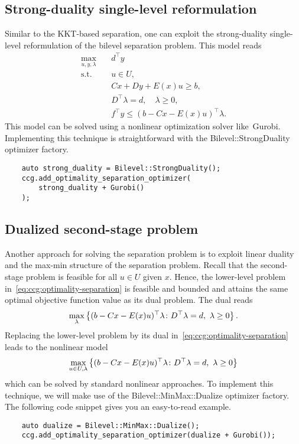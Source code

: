 \subsection{Strong-duality single-level reformulation}

Similar to the KKT-based separation, one can exploit the strong-duality
single-level reformulation of the bilevel separation problem. This model reads
\begin{align*}
    \max_{u,y,\lambda} \quad & d^\top y \\
    \text{s.t.} \quad & u\in U, \\
    & Cx + Dy + E(x)u \ge b, \\ 
    & D^\top \lambda = d, \quad \lambda\ge 0, \\
    & f^\top y \le (b - Cx - E(x)u)^\top\lambda.
\end{align*}
%
This model can be solved using a nonlinear optimization solver
like~\textsf{Gurobi}. Implementing this technique is straightforward with the
\textsf{Bilevel::StrongDuality} optimizer factory.
%
\begin{lstlisting}
    auto strong_duality = Bilevel::StrongDuality();
    ccg.add_optimality_separation_optimizer(
        strong_duality + Gurobi()
    );
\end{lstlisting}

\subsection{Dualized second-stage problem}

Another approach for solving the separation problem is to exploit linear
duality and the max-min structure of the separation problem. Recall that the
second-stage problem is feasible for all $u\in U$ given $x$. Hence, the
lower-level problem in~\eqref{eq:ccg:optimality-separation} is feasible and
bounded and attains the same optimal objective function value as its dual
problem. The dual reads
\begin{equation*}
    \max_{\lambda} \left\{ (b - Cx - E(x)u)^\top\lambda \colon D^\top \lambda = d, \ \lambda \ge 0 \right\}.
\end{equation*}
Replacing the lower-level problem by its dual
in~\eqref{eq:ccg:optimality-separation} leads to the nonlinear model
\begin{equation}
    \label{eq:ccg:optimality-duality-separation}
    \max_{u\in U, \lambda} \left\{ (b - Cx - E(x)u)^\top\lambda \colon D^\top \lambda = d, \ \lambda \ge 0 \right\}
\end{equation}
which can be solved by standard nonlinear approaches. To implement this
technique, we will make use of the \textsf{Bilevel::MinMax::Dualize} optimizer
factory. The following code snippet gives you an easy-to-read example.
%
\begin{lstlisting}
    auto dualize = Bilevel::MinMax::Dualize();
    ccg.add_optimality_separation_optimizer(dualize + Gurobi());
\end{lstlisting}

